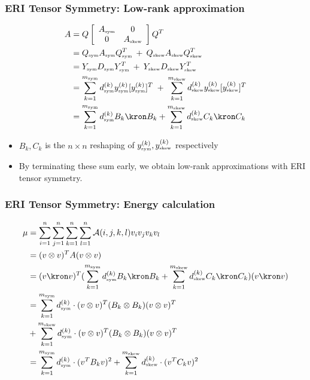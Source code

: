 \documentclass[bigger]{beamer}
\begin{document}
\begin{frame}
\frametitle{ERI Tensor Symmetry: Low-rank approximation}
\label{sec-1-24}

\begin{align*}
A&= Q \left[ \begin{array}{cc} A_{\mbox{\tiny sym}} & 0 \\ 0 & A_{\mbox{\tiny skew}} \end{array} \right] Q^{T}\\
&=  Q_{\mbox{\tiny sym}}A_{\mbox{\tiny sym}} Q_{\mbox{\tiny sym}}^{T} \:+\: Q_{\mbox{\tiny skew}}A_{\mbox{\tiny skew}} Q_{\mbox{\tiny skew}}^{T}\\
&= Y_{\mbox{\tiny sym}}D_{\mbox{\tiny sym}} Y_{\mbox{\tiny sym}}^{T} \:+\: Y_{\mbox{\tiny skew}}D_{\mbox{\tiny skew}} Y_{\mbox{\tiny skew}}^{T}\\
&= \sum_{k=1}^{m_{\mbox{\tiny sym}}} d_{\mbox{\tiny sym}}^{(k)} y_{\mbox{\tiny sym}}^{(k)}[y_{\mbox{\tiny sym}}^{(k)}]^{T} \;+\;
    \sum_{k=1}^{m_{\mbox{\tiny skew}}} d_{\mbox{\tiny skew}}^{(k)} y_{\mbox{\tiny skew}}^{(k)}[y_{\mbox{\tiny skew}}^{(k)}]^{T}\\
&= \sum_{k=1}^{m_{\mbox{\tiny sym}}} d_{\mbox{\tiny sym}}^{(k)} B_k \kron B_k+\sum_{k=1}^{m_{\mbox{\tiny skew}}} d_{\mbox{\tiny skew}}^{(k)} C_k \kron C_k
\end{align*}
\begin{itemize}

\item $B_k,C_k$ is the $n\times n$ reshaping of $y_{\mbox{\tiny sym}}^{(k)},y_{\mbox{\tiny skew}}^{(k)}$ respectively
\label{sec-1-24-1}%

\item By terminating these sum early, we obtain low-rank approximations with ERI tensor symmetry.
\label{sec-1-24-2}%

\end{itemize} %
\end{frame}
\begin{frame}
\frametitle{ERI Tensor Symmetry: Energy calculation}
\label{sec-1-25}

\begin{align*}
\mu 
&= \sum_{i=1}^n \sum_{j=1}^n \sum_{k=1}^n \sum_{l=1}^n \mathcal{A}(i,j,k,l)v_iv_jv_kv_l\\
&= (v \otimes v)^T A (v \otimes v)\\
&= (v\kron v)^{T}(\sum_{k=1}^{m_{\mbox{\tiny sym}}} d_{\mbox{\tiny sym}}^{(k)} B_k \kron B_k+\sum_{k=1}^{m_{\mbox{\tiny skew}}} d_{\mbox{\tiny skew}}^{(k)} C_k \kron C_k)(v \kron v)\\
&= \sum_{k=1}^{m_{\mbox{\tiny sym}}} d_{\mbox{\tiny sym}}^{(k)} \cdot (v \otimes v)^T(B_k\otimes B_k)(v \otimes v)^T \\ 
&+ \sum_{k=1}^{m_{\mbox{\tiny skew}}} d_{\mbox{\tiny sym}}^{(k)} \cdot (v \otimes v)^T(B_k\otimes B_k)(v \otimes v)^T\\
&= \sum_{k=1}^{m_{\mbox{\tiny sym}}} d_{\mbox{\tiny sym}}^{(k)} \cdot (v^TB_kv)^2+ \sum_{k=1}^{m_{\mbox{\tiny skew}}} d_{\mbox{\tiny skew}}^{(k)} \cdot (v^TC_kv)^2
\end{align*}
\end{frame}
\end{document}
